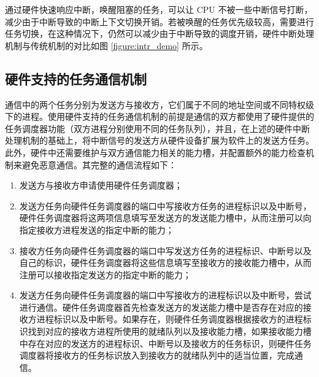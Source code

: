 

通过硬件快速响应中断，唤醒阻塞的任务，可以让 CPU 不被一些中断信号打断，减少由于中断导致的中断上下文切换开销。若被唤醒的任务优先级较高，需要进行任务切换，在这种情况下，仍然可以减少由于中断导致的调度开销，硬件中断处理机制与传统机制的对比如图 \ref{figure:intr_demo} 所示。

\subsection{硬件支持的任务通信机制}

通信中的两个任务分别为发送方与接收方，它们属于不同的地址空间或不同特权级下的进程。使用硬件支持的任务通信机制的前提是通信的双方都使用了硬件提供的任务调度器功能（双方进程分别使用不同的任务队列），并且，在上述的硬件中断处理机制的基础上，将中断信号的发送方从硬件设备扩展为软件上的发送方任务。此外，硬件中还需要维护与双方通信能力相关的能力槽，并配置额外的能力检查机制来避免恶意通信。其完整的通信流程如下：

\begin{enumerate}
    \item 发送方与接收方申请使用硬件任务调度器；

    \item 发送方任务向硬件任务调度器的端口中写接收方任务的进程标识以及中断号，硬件任务调度器将这两项信息填写至发送方的发送能力槽中，从而注册可以向指定接收方进程发送的指定中断的能力；
    
    \item 接收方任务向硬件任务调度器的端口中写发送方任务的进程标识、中断号以及自己的标识，硬件任务调度器将这些信息填写至接收方的接收能力槽中，从而注册可以接收指定发送方的指定中断的能力；
    
    \item 发送方任务向硬件任务调度器的端口中写接收方的进程标识以及中断号，尝试进行通信。硬件任务调度器首先检查发送方的发送能力槽中是否存在对应的接收方进程标识以及中断号。如果存在，则硬件任务调度器根据接收方的进程标识找到对应的接收方进程所使用的就绪队列以及接收能力槽，如果接收能力槽中存在对应的发送方的进程标识、中断号以及接收方的任务标识，则硬件任务调度器将接收方的任务标识放入到接收方的就绪队列中的适当位置，完成通信。

\end{enumerate}

